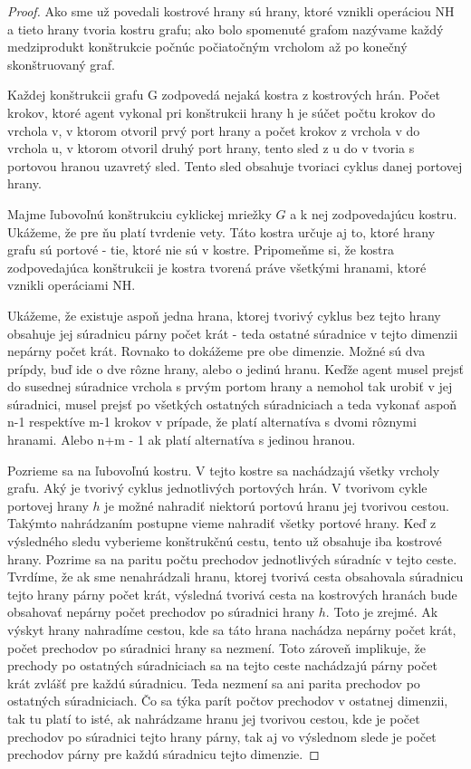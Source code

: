 \begin{proof}
Ako sme už povedali kostrové hrany sú hrany, ktoré vznikli operáciou NH a
tieto hrany tvoria kostru grafu; ako bolo spomenuté grafom nazývame každý
medziprodukt konštrukcie počnúc počiatočným vrcholom až po konečný
skonštruovaný graf.

Každej konštrukcii grafu G zodpovedá nejaká kostra z kostrových hrán. Počet
krokov, ktoré agent vykonal pri konštrukcii hrany h je súčet počtu krokov do
vrchola v, v ktorom otvoril prvý port hrany a počet krokov z vrchola v do
vrchola u, v ktorom otvoril druhý port hrany, 
tento sled z u do v tvoria s portovou
hranou uzavretý sled. Tento sled obsahuje tvoriaci cyklus danej portovej
hrany.

Majme ľubovoľnú konštrukciu cyklickej mriežky $G$ a k nej zodpovedajúcu
kostru. Ukážeme, že pre ňu platí tvrdenie vety.
Táto kostra určuje aj to, ktoré hrany grafu sú portové - tie, ktoré nie sú v
kostre. Pripomeňme si, že kostra zodpovedajúca konštrukcii je kostra tvorená
práve všetkými hranami, ktoré vznikli operáciami NH.

Ukážeme, že existuje aspoň jedna hrana, ktorej tvorivý cyklus bez tejto
hrany obsahuje jej
súradnicu párny počet krát - teda ostatné súradnice v tejto dimenzii nepárny
počet krát. Rovnako to dokážeme pre obe dimenzie. Možné sú dva prípdy, buď
ide o dve rôzne hrany, alebo o jedinú hranu.
Keďže agent musel prejsť do susednej súradnice vrchola s prvým portom hrany
a nemohol tak urobiť v jej súradnici, musel prejsť po všetkých ostatných
súradniciach a teda vykonať aspoň n-1 respektíve m-1 krokov v prípade, že
platí alternatíva s dvomi rôznymi hranami. Alebo n+m - 1 ak platí
alternatíva s jedinou hranou. 

Pozrieme sa na ľubovoľnú kostru. V tejto kostre sa nachádzajú všetky vrcholy
grafu. Aký je tvorivý cyklus jednotlivých portových hrán. V tvorivom cykle
portovej hrany $h$
je možné nahradiť niektorú portovú hranu jej tvorivou cestou. Takýmto
nahrádzaním postupne vieme nahradiť všetky portové hrany. Keď z výsledného
sledu vyberieme konštrukčnú cestu, tento už obsahuje iba kostrové hrany.
Pozrime sa na paritu počtu prechodov jednotlivých súradníc v tejto ceste.
Tvrdíme, že ak sme nenahrádzali hranu, ktorej tvorivá cesta obsahovala
súradnicu tejto hrany párny počet krát, výsledná tvorivá cesta na
kostrových hranách bude obsahovať nepárny počet prechodov po súradnici 
hrany $h$.
Toto je zrejmé. Ak výskyt hrany nahradíme cestou, kde sa táto hrana nachádza
nepárny počet krát, počet prechodov po súradnici hrany sa nezmení. Toto
zároveň implikuje, že prechody po ostatných súradniciach sa na tejto ceste
nachádzajú párny počet krát zvlášť pre každú súradnicu. Teda nezmení sa ani
parita prechodov po ostatných súradniciach.
Čo sa týka parít počtov prechodov v ostatnej dimenzii, tak tu platí to isté,
ak nahrádzame hranu jej tvorivou cestou, kde je počet prechodov po súradnici
tejto hrany párny, tak aj vo výslednom slede je počet prechodov párny pre každú
súradnicu tejto dimenzie.


\end{proof}
